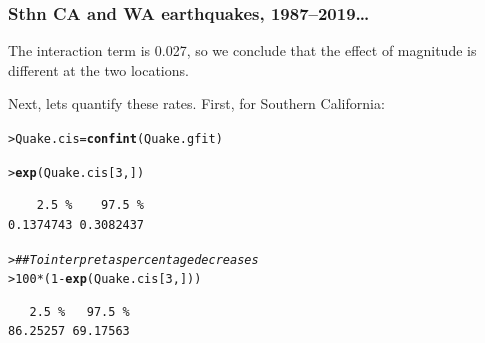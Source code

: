 \documentclass{beamer}\usepackage[]{graphicx}\usepackage[]{xcolor}
\makeatletter
\newcommand{\hlnum}[1]{\textcolor[rgb]{0.686,0.059,0.569}{#1}}%
\newcommand{\hlcom}[1]{\textcolor[rgb]{0.678,0.584,0.686}{\textit{#1}}}%
\newcommand{\hlopt}[1]{\textcolor[rgb]{0,0,0}{#1}}%
\newcommand{\hlstd}[1]{\textcolor[rgb]{0.345,0.345,0.345}{#1}}%
\newcommand{\hlkwb}[1]{\textcolor[rgb]{0.69,0.353,0.396}{#1}}%
\newcommand{\hlkwd}[1]{\textcolor[rgb]{0.737,0.353,0.396}{\textbf{#1}}}%
\newenvironment{kframe}{%
 \def\at@end@of@kframe{}%
 \ifinner\ifhmode%
  \def\at@end@of@kframe{\end{minipage}}%
  \begin{minipage}{\columnwidth}%
 \fi\fi%
 \def\FrameCommand##1{\hskip\@totalleftmargin \hskip-\fboxsep
 \colorbox{shadecolor}{##1}\hskip-\fboxsep
     \hskip-\linewidth \hskip-\@totalleftmargin \hskip\columnwidth}%
 \MakeFramed {\advance\hsize-\width
   \@totalleftmargin\z@ \linewidth\hsize
   \@setminipage}}%
 {\par\unskip\endMakeFramed%
 \at@end@of@kframe}
\newenvironment{knitrout}{}{} %
\makeatother
\begin{document}
\begin{frame}[fragile]
\frametitle{Sthn CA and WA earthquakes, 1987--2019\ldots}

The interaction term \pval{} is 0.027, so we conclude that the effect of magnitude is different at the two locations.
\bigskip

Next, lets quantify these rates. First, for Southern California:
\begin{knitrout}\scriptsize
{}\color{fgcolor}\begin{kframe}
\begin{alltt}
\hlstd{> }\hlstd{Quake.cis} \hlkwb{=} \hlkwd{confint}\hlstd{(Quake.gfit)}
\end{alltt}


{\ttfamily\noindent\itshape\color{messagecolor}{Waiting for profiling to be done...}}\begin{alltt}
\hlstd{> }\hlkwd{exp}\hlstd{(Quake.cis[}\hlnum{3}\hlstd{,])}
\end{alltt}
\begin{verbatim}
    2.5 %    97.5 % 
0.1374743 0.3082437 
\end{verbatim}
\begin{alltt}
\hlstd{> }\hlcom{## To interpret as percentage decreases}
\hlstd{> }\hlnum{100}\hlopt{*}\hlstd{(}\hlnum{1}\hlopt{-}\hlkwd{exp}\hlstd{(Quake.cis[}\hlnum{3}\hlstd{,]))}
\end{alltt}
\begin{verbatim}
   2.5 %   97.5 % 
86.25257 69.17563 
\end{verbatim}
\end{kframe}
\end{knitrout}
\end{frame}
\end{document}
